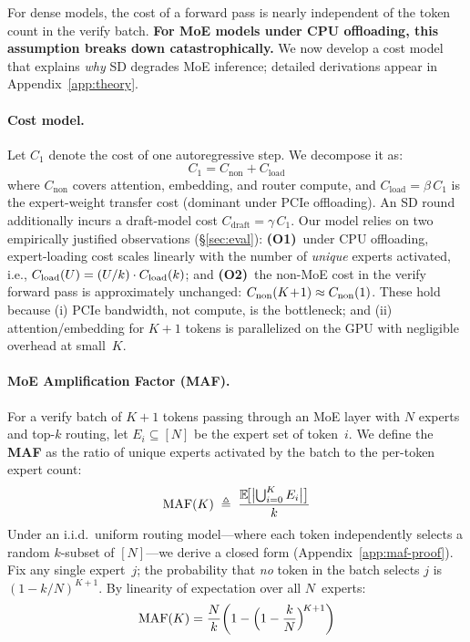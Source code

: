 \documentclass[letterpaper,twocolumn,10pt]{article}
\begin{document}
For dense models, the cost of a forward pass is nearly independent of the
token count in the verify batch.  \textbf{For MoE models under CPU
offloading, this assumption breaks down catastrophically.}  We now develop
a cost model that explains \emph{why} SD degrades MoE inference;
detailed derivations appear in Appendix~\ref{app:theory}.

\paragraph{Cost model.}
Let $C_1$ denote the cost of one autoregressive step.  We decompose it as:
\begin{equation}\label{eq:cost-decompose}
  C_1 = C_{\text{non}} + C_{\text{load}}
\end{equation}
where $C_{\text{non}}$ covers attention, embedding, and router compute,
and $C_{\text{load}} = \beta\,C_1$ is the expert-weight transfer cost
(dominant under PCIe offloading).  An SD round additionally incurs
a draft-model cost $C_{\text{draft}} = \gamma\,C_1$.  Our model relies on
two empirically justified observations (\S\ref{sec:eval}):
\textbf{(O1)}~under CPU offloading, expert-loading cost scales linearly
with the number of \emph{unique} experts activated,
i.e., $C_{\textup{load}}(U) = (U/k) \cdot C_{\textup{load}}(k)$; and
\textbf{(O2)}~the non-MoE cost in the verify forward pass is approximately
unchanged: $C_{\textup{non}}(K\!+\!1) \approx C_{\textup{non}}(1)$.
These hold because (i) PCIe bandwidth, not compute, is the
bottleneck; and (ii) attention/embedding for $K\!+\!1$ tokens is
parallelized on the GPU with negligible overhead at small~$K$.

\paragraph{MoE Amplification Factor (MAF).}
For a verify batch of $K\!+\!1$ tokens passing through an MoE layer
with $N$ experts and top-$k$ routing, let $E_i \subseteq [N]$ be the
expert set of token~$i$.  We define the \textbf{MAF} as the ratio of
unique experts activated by the batch to the per-token expert count:
\begin{equation}\label{eq:maf}
  \textup{MAF}(K)
  \;\triangleq\;
  \frac{\mathbb{E}\!\bigl[\bigl|\bigcup_{i=0}^{K} E_i\bigr|\bigr]}{k}
\end{equation}
Under an i.i.d.\ uniform routing model---where each token independently
selects a random $k$-subset of $[N]$---we derive a closed form
(Appendix~\ref{app:maf-proof}).  Fix any single expert~$j$; the
probability that \emph{no} token in the batch selects $j$ is
$(1-k/N)^{K+1}$.  By linearity of expectation over all $N$~experts:
\begin{equation}\label{eq:maf-formula}
  \textup{MAF}(K) = \frac{N}{k}\!\left(1 - \Bigl(1-\frac{k}{N}\Bigr)^{\!K+1}\right)
\end{equation}
\end{document}
